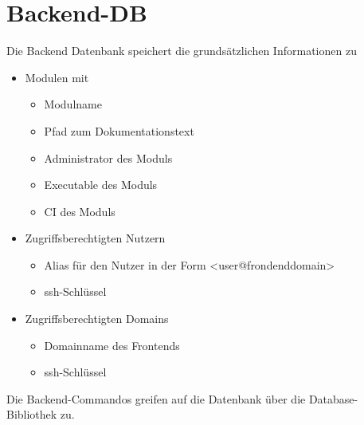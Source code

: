 \section{Backend-DB}

Die Backend Datenbank speichert die grundsätzlichen Informationen zu

\begin{itemize}
  \item Modulen mit
	\begin{itemize}
	  \item Modulname
	  \item Pfad zum Dokumentationstext
	  \item Administrator des Moduls
	  \item Executable des Moduls
	  \item CI des Moduls
	\end{itemize}

  \item Zugriffsberechtigten Nutzern
	\begin{itemize}
	  \item Alias für den Nutzer in der Form <user@frondenddomain>
	  \item ssh-Schlüssel
	\end{itemize}

  \item Zugriffsberechtigten Domains
	\begin{itemize}
	  \item Domainname des Frontends
	  \item ssh-Schlüssel
	\end{itemize}
\end{itemize}

Die Backend-Commandos greifen auf die Datenbank über die Database-Bibliothek
zu.
